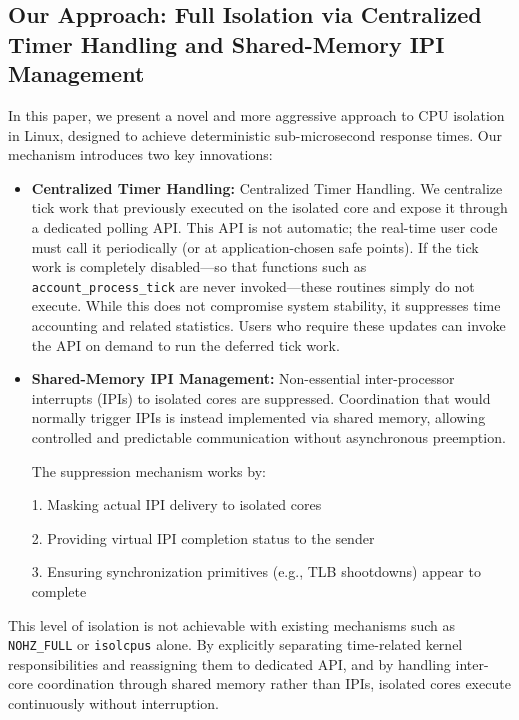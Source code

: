 \documentclass[letterpaper]{article}
\begin{document}
\subsection{Our Approach: Full Isolation via Centralized Timer Handling and Shared-Memory IPI Management}

In this paper, we present a novel and more aggressive approach to CPU isolation in Linux, 
designed to achieve deterministic sub-microsecond response times. 
Our mechanism introduces two key innovations:

\begin{itemize}
\item \textbf{Centralized Timer Handling:} Centralized Timer Handling. We centralize tick work that previously executed on the isolated core
  and expose it through a dedicated polling API. This API is not automatic; the real-time user code must call it periodically
  (or at application-chosen safe points). If the tick work is completely disabled—so that functions such as \texttt{account\_process\_tick} are
  never invoked—these routines simply do not execute. While this does not compromise system stability, it suppresses time accounting and related statistics.
  Users who require these updates can invoke the API on demand to run the deferred tick work.
    
    \item \textbf{Shared-Memory IPI Management:} Non-essential inter-processor interrupts (IPIs) to isolated cores 
    are suppressed. Coordination that would normally trigger IPIs is instead implemented via shared memory, 
    allowing controlled and predictable communication without asynchronous preemption.

    The suppression mechanism works by:
    
    1. Masking actual IPI delivery to isolated cores
    
    2. Providing virtual IPI completion status to the sender
    
    3. Ensuring synchronization primitives (e.g., TLB shootdowns) appear to complete
    
\end{itemize}

This level of isolation is not achievable with existing mechanisms such as 
\texttt{NOHZ\_FULL} or \texttt{isolcpus} alone. 
By explicitly separating time-related kernel responsibilities and reassigning them to dedicated API, 
and by handling inter-core coordination through shared memory rather than IPIs, 
isolated cores execute continuously without interruption.  
\end{document}
